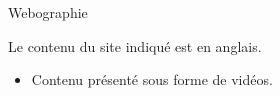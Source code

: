 \begin{frame}{Webographie}

\begin{remarque}

Le contenu du site indiqué est en anglais.

\end{remarque}

\begin{itemize}

\item {}

\bigskip

Contenu présenté sous forme de vidéos.

\end{itemize}

\begin{toile}
\end{toile}

\end{frame}
